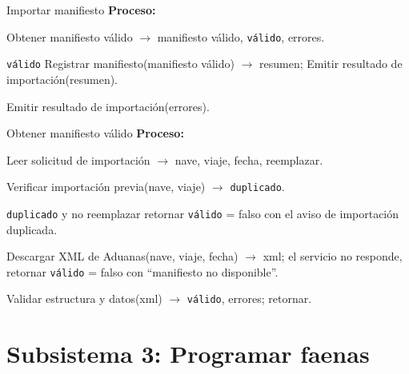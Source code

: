 \begin{modspec}{Importar manifiesto}
\textbf{Proceso:}
\begin{logica}
    \item Obtener manifiesto válido $\rightarrow$ manifiesto válido, \texttt{válido}, errores.
    \item {} \texttt{válido}  Registrar manifiesto(manifiesto válido)
    $\rightarrow$ resumen; Emitir resultado de importación(resumen).
    \item {} Emitir resultado de importación(errores).
\end{logica}
\end{modspec}

\begin{modspec}{Obtener manifiesto válido}
\textbf{Proceso:}
\begin{logica}
    \item Leer solicitud de importación $\rightarrow$ nave, viaje, fecha, reemplazar.
    \item Verificar importación previa(nave, viaje) $\rightarrow$ \texttt{duplicado}.
    \item {} \texttt{duplicado} y no reemplazar  retornar \texttt{válido} =
    falso con el aviso de importación duplicada.
    \item Descargar XML de Aduanas(nave, viaje, fecha) $\rightarrow$ xml;  el servicio
    no responde, retornar \texttt{válido} = falso con ``manifiesto no disponible''.
    \item Validar estructura y datos(xml) $\rightarrow$ \texttt{válido}, errores; retornar.
\end{logica}
\end{modspec}

\section{Subsistema 3: Programar faenas}

